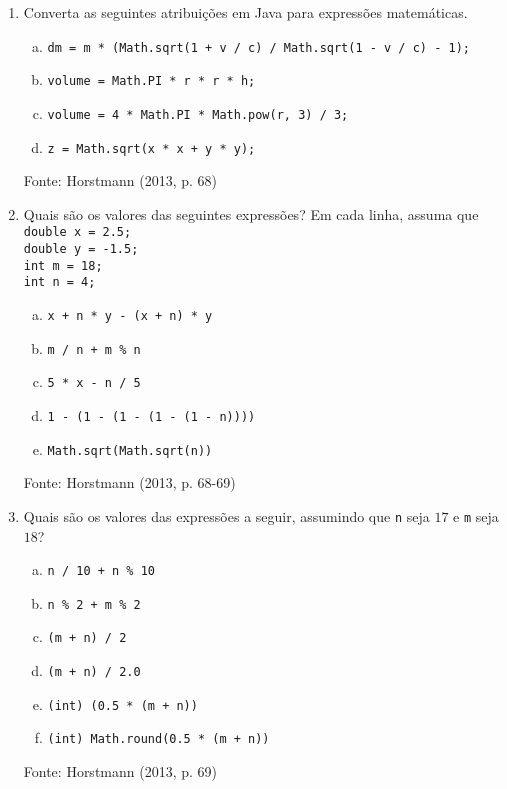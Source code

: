 \documentclass[onecolumn,a4paper,10pt]{report}
\newcommand{\+}{\, + \,}
\newcommand{\<}{\hspace*{-0.4cm}}
\begin{document}
\begin{enumerate}[1.]
\item Converta as seguintes atribuições em Java para expressões matemáticas.
\begin{enumerate}[a)]
\item \texttt{dm = m * (Math.sqrt(1 + v / c) / Math.sqrt(1 - v / c) - 1);}
\item \texttt{volume = Math.PI * r * r * h;}
\item \texttt{volume = 4 * Math.PI * Math.pow(r, 3) / 3;}
\item \texttt{z = Math.sqrt(x * x + y * y);}
\end{enumerate}
{\tiny Fonte: Horstmann (2013, p. 68)}

\item Quais são os valores das seguintes expressões? Em cada linha, assuma que\\
\texttt{double x = 2.5;\\
double y = -1.5;\\
int m = 18;\\
int n = 4;}
\begin{enumerate}[a)]
\item \texttt{x + n * y - (x + n) * y}
\item \texttt{m / n + m \% n}
\item \texttt{5 * x - n / 5}
\item \texttt{1 - (1 - (1 - (1 - (1 - n))))}
\item \texttt{Math.sqrt(Math.sqrt(n))}
\end{enumerate}
{\tiny Fonte: Horstmann (2013, p. 68-69)}

\item Quais são os valores das expressões a seguir, assumindo que \texttt{n} seja $17$ e \texttt{m} seja $18$?
\begin{enumerate}[a)]
\item \texttt{n / 10 + n \% 10}
\item \texttt{n \% 2 + m \% 2}
\item \texttt{(m + n) / 2}
\item \texttt{(m + n) / 2.0}
\item \texttt{(int) (0.5 * (m + n))}
\item \texttt{(int) Math.round(0.5 * (m + n))}
\end{enumerate}
{\tiny Fonte: Horstmann (2013, p. 69)}


\end{enumerate}
\end{document}
